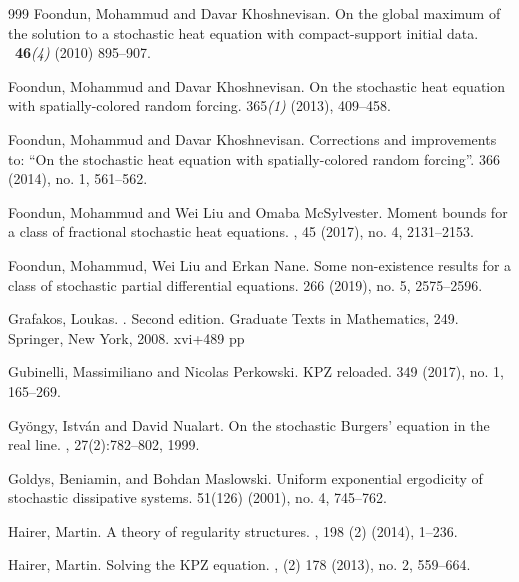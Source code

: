 \documentclass[a4paper,12pt]{article}
\theoremstyle{plain}
\theoremstyle{definition}
\begin{document}
\begin{thebibliography}{999}
 Foondun, Mohammud and Davar Khoshnevisan.
\newblock On the global maximum of the solution to a stochastic heat equation with compact-support initial data.
\ {\bf 46}{\it (4)} (2010) 895--907.

Foondun, Mohammud and Davar Khoshnevisan.
\newblock On the stochastic heat equation with spatially-colored random forcing.
 365{\it (1)} (2013), 409--458.

 Foondun, Mohammud and Davar Khoshnevisan.
\newblock Corrections and improvements to: ``On the stochastic heat equation with spatially-colored random forcing''.
 366 (2014), no. 1, 561--562.

 Foondun, Mohammud and  Wei Liu and Omaba McSylvester.
\newblock Moment bounds  for a class of fractional stochastic heat equations.
, 45 (2017), no. 4, 2131--2153.

Foondun, Mohammud, Wei Liu and Erkan Nane.
\newblock Some non-existence results for a class of stochastic partial differential equations. 
 266 (2019), no. 5, 2575--2596.

Grafakos, Loukas. 
. 
\newblock Second edition. Graduate Texts in Mathematics, 249. Springer, New York, 2008. xvi+489 pp

Gubinelli, Massimiliano  and Nicolas Perkowski.
\newblock KPZ reloaded.
 349 (2017), no. 1, 165--269.

Gy{\"o}ngy, Istv{\'a}n and David Nualart.
\newblock On the stochastic {B}urgers' equation in the real line.
, 27(2):782--802, 1999.

Goldys, Beniamin, and Bohdan Maslowski.
\newblock Uniform exponential ergodicity of stochastic dissipative systems. 
 51(126) (2001), no. 4, 745--762. 

Hairer, Martin.
\newblock A theory of regularity structures.
, 198 (2) (2014), 1--236.

Hairer, Martin.
\newblock Solving the KPZ equation.
, (2) 178 (2013), no. 2, 559--664.



\end{thebibliography}
\end{document}
